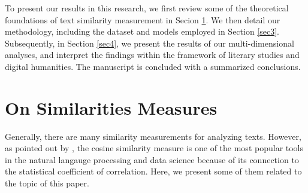 \documentclass[twoside]{article}
\begin{document}
To present our results in this research, we first review some of the theoretical foundations of text similarity measurement in Secion 
\ref{sec2}.
We then detail our methodology, including the dataset and models employed in Section  \ref{sec3}. Subsequently, 
in Section \ref{sec4}, we present the results of our multi-dimensional analyses, and interpret the findings within the framework of literary studies and digital humanities.  The manuscript is concluded with a summarized conclusions.


					\section{On Similarities Measures}\label{sec2}
Generally, there are many similarity measurements for analyzing texts.  However, as pointed out by \cite{Birdetal:2009}, the cosine similarity measure is one of the most popular tools in the natural langauge processing and data science  because of its connection to the statistical coefficient of  correlation.  Here, we present some of them related to the topic of this paper. 
\end{document}
